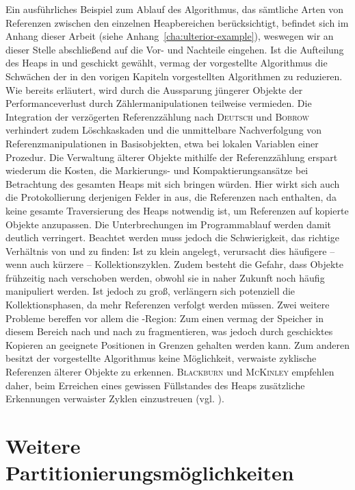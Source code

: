 Ein ausführliches Beispiel zum Ablauf des Algorithmus, das sämtliche Arten von Referenzen zwischen den einzelnen Heapbereichen berücksichtigt, befindet sich im Anhang dieser Arbeit (siehe Anhang~\ref{cha:ulterior-example}), weswegen wir an dieser Stelle abschließend auf die Vor- und Nachteile eingehen.
Ist die Aufteilung des Heaps in \Nursery und \Mature geschickt gewählt, vermag der vorgestellte Algorithmus die Schwächen der in den vorigen Kapiteln vorgestellten Algorithmen zu reduzieren.
Wie bereits erläutert, wird durch die Aussparung jüngerer Objekte der Performanceverlust durch Zählermanipulationen teilweise vermieden.
Die Integration der verzögerten Referenzzählung nach \textsc{Deutsch} und \textsc{Bobrow} verhindert zudem Löschkaskaden und die unmittelbare Nachverfolgung von Referenzmanipulationen in Basisobjekten, etwa bei lokalen Variablen einer Prozedur.
Die Verwaltung älterer Objekte mithilfe der Referenzzählung erspart wiederum die Kosten, die Markierungs- und Kompaktierungsansätze bei Betrachtung des gesamten Heaps mit sich bringen würden.
Hier wirkt sich auch die Protokollierung derjenigen Felder in \Mature aus, die Referenzen nach \Nursery enthalten, da keine gesamte Traversierung des Heaps notwendig ist, um Referenzen auf kopierte Objekte anzupassen.
Die Unterbrechungen im Programmablauf werden damit deutlich verringert.
Beachtet werden muss jedoch die Schwierigkeit, das richtige Verhältnis von \Nursery und \Mature zu finden:
Ist \Nursery zu klein angelegt, verursacht dies häufigere -- wenn auch kürzere -- Kollektionszyklen.
Zudem besteht die Gefahr, dass Objekte frühzeitig nach \Mature verschoben werden, obwohl sie in naher Zukunft noch häufig manipuliert werden.
Ist \Nursery jedoch zu groß, verlängern sich potenziell die Kollektionsphasen, da mehr Referenzen verfolgt werden müssen.
Zwei weitere Probleme bereffen vor allem die \Mature-Region:
Zum einen vermag der Speicher in diesem Bereich nach und nach zu fragmentieren, was jedoch durch geschicktes Kopieren an geeignete Positionen in Grenzen gehalten werden kann.
Zum anderen besitzt der vorgestellte Algorithmus keine Möglichkeit, verwaiste zyklische Referenzen älterer Objekte zu erkennen.
\textsc{Blackburn} und \textsc{McKinley} empfehlen daher, beim Erreichen eines gewissen Füllstandes des Heaps zusätzliche Erkennungen verwaister Zyklen einzustreuen (vgl. \cite[S. 349]{blackburn2003}).




\section{Weitere Partitionierungsmöglichkeiten}
\label{sec:partitioning}

